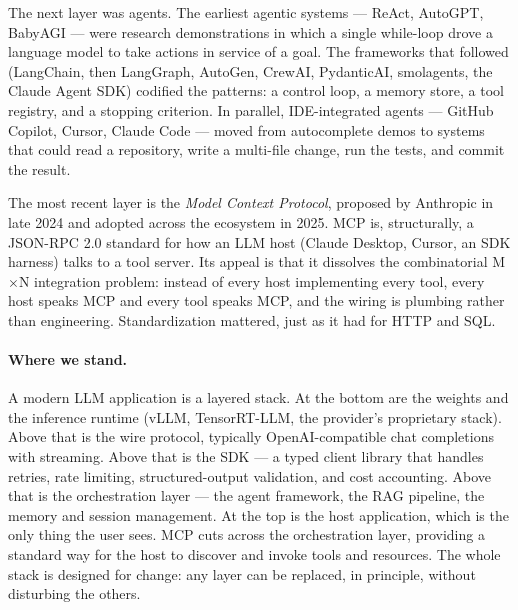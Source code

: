 The next layer was agents. The earliest agentic systems --- ReAct,
AutoGPT, BabyAGI --- were research demonstrations in which a
single while-loop drove a language model to take actions in service
of a goal. The frameworks that followed (LangChain, then LangGraph,
AutoGen, CrewAI, PydanticAI, smolagents, the Claude Agent SDK)
codified the patterns: a control loop, a memory store, a tool
registry, and a stopping criterion. In parallel, IDE-integrated
agents --- GitHub Copilot, Cursor, Claude Code --- moved from
autocomplete demos to systems that could read a repository, write a
multi-file change, run the tests, and commit the result.

The most recent layer is the \emph{Model Context Protocol},
proposed by Anthropic in late 2024 and adopted across the
ecosystem in 2025. MCP is, structurally, a JSON-RPC 2.0 standard
for how an LLM host (Claude Desktop, Cursor, an SDK harness) talks
to a tool server. Its appeal is that it dissolves the
combinatorial M$\times$N integration problem: instead of every host
implementing every tool, every host speaks MCP and every tool
speaks MCP, and the wiring is plumbing rather than engineering.
Standardization mattered, just as it had for HTTP and SQL.

\paragraph{Where we stand.}
A modern LLM application is a layered stack. At the bottom are the
weights and the inference runtime (vLLM, TensorRT-LLM, the
provider's proprietary stack). Above that is the wire protocol,
typically OpenAI-compatible chat completions with streaming. Above
that is the SDK --- a typed client library that handles retries,
rate limiting, structured-output validation, and cost accounting.
Above that is the orchestration layer --- the agent framework, the
RAG pipeline, the memory and session management. At the top is the
host application, which is the only thing the user sees. MCP cuts
across the orchestration layer, providing a standard way for the
host to discover and invoke tools and resources. The whole stack is
designed for change: any layer can be replaced, in principle,
without disturbing the others.

